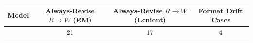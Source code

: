 \begin{tabular}{lccc}
\toprule
Model & Always-Revise $R\to W$ (EM) & Always-Revise $R\to W$ (Lenient) & Format Drift Cases \\
\midrule
\modelA{} & 21 & 17 & 4 \\
\bottomrule
\end{tabular}
